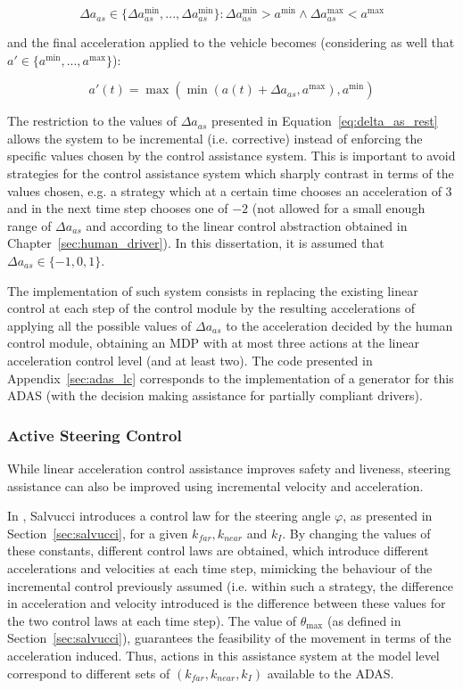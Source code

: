 \begin{equation}
\label{eq:delta_as_rest}
	\Delta a_{as} \in \{\Delta a_{as}^{\min},...,\Delta a_{as}^{\min}\}: \Delta a_{as}^{\min} > a^{\min} \wedge \Delta a_{as}^{\max} < a^{\max}
\end{equation}

and the final acceleration applied to the vehicle becomes (considering as well that $a' \in \{a^{\min},...,a^{\max}\}$):

\begin{equation}
	a'(t) = \max (\min (a(t) + \Delta a_{as}, a^{\max}), a^{\min})
\end{equation}

The restriction to the values of $\Delta a_{as}$ presented in Equation~\ref{eq:delta_as_rest} allows the system to be incremental (i.e. corrective) instead of enforcing the specific values chosen by the control assistance system. This is important to avoid strategies for the control assistance system which sharply contrast in terms of the values chosen, e.g. a strategy which at a certain time chooses an acceleration of $3$ and in the next time step chooses one of $-2$ (not allowed for a small enough range of $\Delta a_{as}$ and according to the linear control abstraction obtained in Chapter~\ref{sec:human_driver}). In this dissertation, it is assumed that $\Delta a_{as} \in \{-1,0,1\}$.

The implementation of such system consists in replacing the existing linear control at each step of the control module by the resulting accelerations of applying all the possible values of $\Delta a_{as}$ to the acceleration decided by the human control module, obtaining an MDP with at most three actions at the linear acceleration control level (and at least two). The code presented in Appendix~\ref{sec:adas_lc} corresponds to the implementation of a generator for this ADAS (with the decision making assistance for partially compliant drivers).

\subsubsection{Active Steering Control}

While linear acceleration control assistance improves safety and liveness, steering assistance can also be improved using incremental velocity and acceleration. 

In \cite{salvucci_1}, Salvucci introduces a control law for the steering angle $\varphi$, as presented in Section~\ref{sec:salvucci}, for a given $k_{far}, k_{near}$ and $k_I$. By changing the values of these constants, different control laws are obtained, which introduce different accelerations and velocities at each time step, mimicking the behaviour of the incremental control previously assumed (i.e. within such a strategy, the difference in acceleration and velocity introduced is the difference between these values for the two control laws at each time step). The value of $\theta_{\max}$ (as defined in Section~\ref{sec:salvucci}), guarantees the feasibility of the movement in terms of the acceleration induced. Thus, actions in this assistance system at the model level correspond to different sets of $(k_{far}, k_{near},k_I)$ available to the ADAS.

